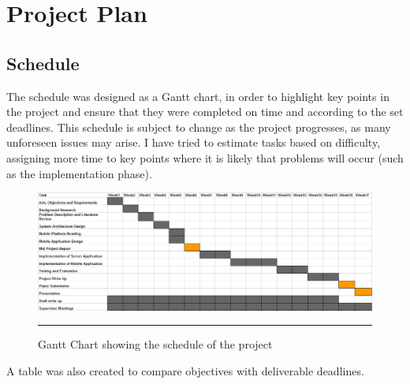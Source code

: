 
\chapter{Project Plan} %

\label{Chapter2} %



\section{Schedule}

The schedule was designed as a Gantt chart, in order to highlight key points in the project and ensure that they were completed on time and according to the set deadlines. This schedule is subject to change as the project progresses, as many unforeseen issues may arise. I have tried to estimate tasks based on difficulty, assigning more time to key points where it is likely that problems will occur (such as the implementation phase). 

\begin{figure}
	\centering
\includegraphics[width=\textheight, keepaspectratio]{Figures/projectgant.png}
		\rule{35em}{0.5pt}
	\caption[Gantt Chart showing the schedule of the project]{Gantt Chart showing the schedule of the project}
	\label{fig:projectgant}
\end{figure}

A table was also created to compare objectives with deliverable deadlines.

